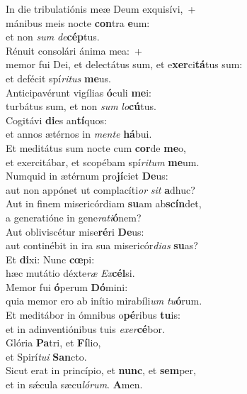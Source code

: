 \evenverse In die tribulatiónis meæ Deum exquisívi,~+\\\evenverse  mánibus meis nocte \textbf{con}tra \textbf{e}um:~\*\\
\evenverse et non \textit{sum} \textit{de}\textbf{cép}tus.\\
\oddverse Rénuit consolári ánima mea:~+\\
\oddverse  memor fui Dei, et delectátus sum, et e\textbf{xer}ci\textbf{tá}tus sum:~\*\\
\oddverse et defécit spí\textit{ri}\textit{tus} \textbf{me}us.\\
\evenverse Anticipavérunt vigílias \textbf{ó}culi \textbf{me}i:~\*\\
\evenverse turbátus sum, et non \textit{sum} \textit{lo}\textbf{cú}tus.\\
\oddverse Cogitávi \textbf{di}es an\textbf{tí}quos:~\*\\
\oddverse et annos ætérnos in \textit{men}\textit{te} \textbf{há}bui.\\
\evenverse Et meditátus sum nocte cum \textbf{cor}de \textbf{me}o,~\*\\
\evenverse et exercitábar, et scopébam spí\textit{ri}\textit{tum} \textbf{me}um.\\
\oddverse Numquid in ætérnum pro\textbf{jí}ciet \textbf{De}us:~\*\\
\oddverse aut non appónet ut complacíti\textit{or} \textit{sit} \textbf{a}dhuc?\\
\evenverse Aut in finem misericórdiam \textbf{su}am ab\textbf{scín}det,~\*\\
\evenverse a generatióne in gene\textit{ra}\textit{ti}\textbf{ó}nem?\\
\oddverse Aut obliviscétur mise\textbf{ré}ri \textbf{De}us:~\*\\
\oddverse aut continébit in ira sua misericór\textit{di}\textit{as} \textbf{su}as?\\
\evenverse Et \textbf{di}xi: Nunc \textbf{cœ}pi:~\*\\
\evenverse hæc mutátio déxte\textit{ræ} \textit{Ex}\textbf{cél}si.\\
\oddverse Memor fui \textbf{ó}perum \textbf{Dó}mini:~\*\\
\oddverse quia memor ero ab inítio mirabíli\textit{um} \textit{tu}\textbf{ó}rum.\\
\evenverse Et meditábor in ómnibus o\textbf{pé}ribus \textbf{tu}is:~\*\\
\evenverse et in adinventiónibus tuis \textit{e}\textit{xer}\textbf{cé}bor.\\
\oddverse Glória \textbf{Pa}tri, et \textbf{Fí}lio,~\*\\
\oddverse et Spirí\textit{tu}\textit{i} \textbf{San}cto.\\
\evenverse Sicut erat in princípio, et \textbf{nunc}, et \textbf{sem}per,~\*\\
\evenverse et in sǽcula sæcu\textit{ló}\textit{rum}. \textbf{A}men.\\
